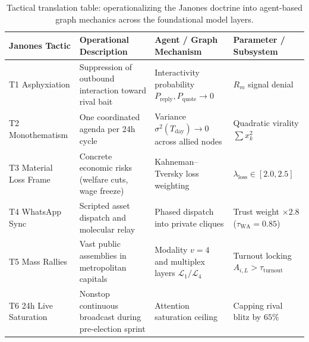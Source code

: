 \documentclass[11pt,a4paper]{article}
\begin{document}
\begin{table}[htbp]
\centering
\caption{Tactical translation table: operationalizing the Janones doctrine into agent-based graph mechanics across the foundational model layers.}
\label{tab:supp_janones_tactics}
\footnotesize
\setlength{\tabcolsep}{4pt}
\begin{tabular}{lp{4.2cm}p{3.8cm}p{2.8cm}}
\toprule
\textbf{Janones Tactic} & \textbf{Operational Description} & \textbf{Agent / Graph Mechanism} & \textbf{Parameter / Subsystem} \\
\midrule
T1 Asphyxiation & Suppression of outbound interaction toward rival bait & Interactivity probability $P_{\mathrm{reply}}, P_{\mathrm{quote}} \to 0$ & $R_m$ signal denial \\
T2 Monothematism & One coordinated agenda per 24h cycle & Variance $\sigma^2(T_{\mathrm{day}}) \to 0$ across allied nodes & Quadratic virality $\sum x_k^2$ \\
T3 Material Loss Frame & Concrete economic risks (welfare cuts, wage freeze) & Kahneman--Tversky loss weighting & $\lambda_{\mathrm{loss}} \in [2.0, 2.5]$ \\
T4 WhatsApp Sync & Scripted asset dispatch and molecular relay & Phased dispatch into private cliques & Trust weight $\times 2.8$ ($\tau_{\text{WA}} = 0.85$) \\
T5 Mass Rallies & Vast public assemblies in metropolitan capitals & Modality $v=4$ and multiplex layers $\mathcal{L}_1/\mathcal{L}_4$ & Turnout locking $A_{i,L} > \tau_{\mathrm{turnout}}$ \\
T6 24h Live Saturation & Nonstop continuous broadcast during pre-election sprint & Attention saturation ceiling & Capping rival blitz by $65\%$ \\
\bottomrule
\end{tabular}
\end{table}

\clearpage


\end{document}
